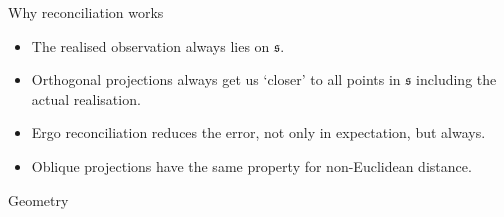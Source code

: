 \documentclass{beamer}
\begin{document}
  \begin{frame}{Why reconciliation works}
  \begin{itemize}
  	\item The realised observation always lies on $\mathfrak{s}$.
  	\item Orthogonal projections always get us `closer' to all points in $\mathfrak{s}$ including the actual realisation.
  	\item Ergo reconciliation reduces the error, not only in expectation, but always. 
  	\item Oblique projections have the same property for non-Euclidean distance. 
  \end{itemize}
  \end{frame}
  \begin{frame}{Geometry}
  \vspace{-2.3cm}
  \centering 
  
  \end{frame}
\end{document}
